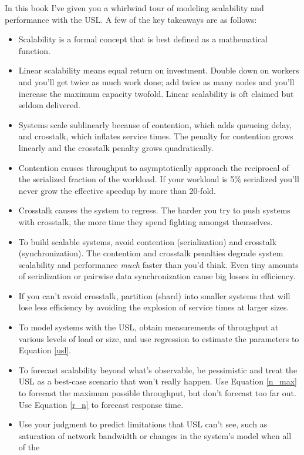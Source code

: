 \documentclass{vivid_layout}
\begin{document}
In this book I've given you a whirlwind tour of modeling scalability and
performance with the USL. A few of the key takeaways are as follows:

\begin{itemize}
\item Scalability is a formal concept that is best defined as a mathematical
function.
\item Linear scalability means equal return on investment. Double down on
workers and you'll get twice as much work done; add twice as many nodes and
you'll increase the maximum capacity twofold. Linear scalability is oft claimed
but seldom delivered.
\item Systems scale sublinearly because of contention, which adds queueing
delay, and crosstalk, which inflates service times. The penalty for contention
grows linearly and the crosstalk penalty grows quadratically.
\item Contention causes throughput to asymptotically approach the
reciprocal of the serialized fraction of the workload. If your workload is 5\%
serialized you'll never grow the effective speedup by more than 20-fold.
\item Crosstalk causes the system to regress. The harder you try to push systems
with crosstalk, the more time they spend fighting amongst themselves.
\item To build scalable systems, avoid contention (serialization) and crosstalk
(synchronization).
The contention and crosstalk penalties degrade system scalability and
performance {\itshape much} faster than you'd think. Even tiny amounts of
serialization or pairwise data synchronization cause big losses in efficiency.
\item If you can't avoid crosstalk, partition (shard) into smaller systems that will
lose less efficiency by avoiding the explosion of service times at larger sizes.
\item To model systems with the USL, obtain measurements of throughput at
various levels of load or size, and use regression to estimate the parameters to
Equation \ref{usl}.
\item To forecast scalability beyond what's observable, be pessimistic and treat
the USL as a best-case scenario that won't really happen. Use Equation
\ref{n_max} to forecast the maximum possible throughput, but don't forecast too
far out. Use Equation \ref{r_n} to forecast response time.
\item Use your judgment to predict limitations that USL can't see, such as
saturation of network bandwidth or changes in the system's model when all of the

\end{itemize}
\end{document}

